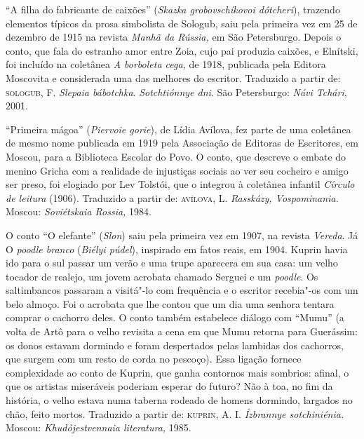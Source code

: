 {\medskip

``A filha do fabricante de caixões'' (\emph{Skazka grobovschíkovoi
dótcheri}), trazendo elementos típicos da prosa simbolista de Sologub,
saiu pela primeira vez em 25 de dezembro de 1915 na revista \emph{Manhã
da Rússia,} em São Petersburgo. Depois o conto, que fala do estranho
amor entre Zoia, cujo pai produzia caixões, e Elnítski, foi incluído na
coletânea \emph{A borboleta cega,} de 1918, publicada pela Editora
Moscovita e considerada uma das melhores do escritor.
Traduzido a partir de:
\textsc{sologub}, F. \emph{Slepaia bábotchka}. \emph{Sotchtiónnye dni}. São
Petersburgo: \emph{Návi Tchári}, 2001.

\medskip

``Primeira mágoa'' (\emph{Piervoie gorie}), de Lídia Avílova,
fez parte de uma coletânea de
mesmo nome publicada em 1919 pela Associação de Editoras de
Escritores, em Moscou, para a Biblioteca Escolar do Povo. O
conto, que descreve o embate do menino Gricha com a realidade de
injustiças sociais ao ver seu cocheiro e amigo ser preso, foi elogiado
por Lev Tolstói, que o integrou à coletânea infantil \emph{Círculo de
leitura} (1906).
Traduzido a partir de:
\textsc{avílova}, L. \emph{Rasskázy, Vospominania.} Moscou: \emph{Soviétskaia
Rossia,} 1984.

\medskip

O conto ``O elefante'' (\emph{Slon}) saiu pela primeira vez em 1907,
na revista \emph{Vereda}. Já O \emph{poodle branco} (\emph{Biélyi
púdel}), inspirado em fatos reais, em 1904. Kuprin havia ido para o sul
passar um verão e uma trupe aparecera em sua casa: um velho tocador de
realejo, um jovem acrobata chamado Serguei e um \emph{poodle}. Os
saltimbancos passaram a visitá"-lo com frequência e o escritor recebia"-os
com um belo almoço. Foi o acrobata que lhe contou que um dia uma senhora
tentara comprar o cachorro deles. O conto também estabelece diálogo com
``Mumu'' (a volta de Artô para o velho revisita a cena em que Mumu
retorna para Guerássim: os donos estavam dormindo e foram despertados
pelas lambidas dos cachorros, que surgem com um resto de corda no
pescoço). Essa ligação fornece complexidade ao conto de Kuprin, que
ganha contornos mais sombrios: afinal, o que os artistas miseráveis
poderiam esperar do futuro? Não à toa, no fim da história, o velho
estava numa taberna rodeado de homens dormindo, largados no chão, feito mortos.
Traduzido a partir de:
\textsc{kuprin}, A. I. \emph{Ízbrannye sotchiniénia.} Moscou:
\emph{Khudójestvennaia literatura,} 1985.

}

